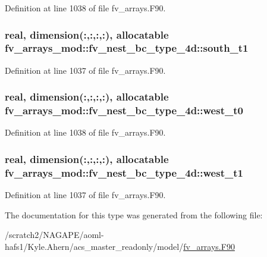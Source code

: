 Definition at line 1038 of file fv\-\_\-arrays.\-F90.

\subsubsection[{south\-\_\-t1}]{\setlength{\rightskip}{0pt plus 5cm}real, dimension(\-:,\-:,\-:,\-:), allocatable fv\-\_\-arrays\-\_\-mod\-::fv\-\_\-nest\-\_\-bc\-\_\-type\-\_\-4d\-::south\-\_\-t1}\label{structfv__arrays__mod_1_1fv__nest__bc__type__4d_a8c7b5e62f810595da5d2f3e668cecb46}


Definition at line 1037 of file fv\-\_\-arrays.\-F90.

\subsubsection[{west\-\_\-t0}]{\setlength{\rightskip}{0pt plus 5cm}real, dimension(\-:,\-:,\-:,\-:), allocatable fv\-\_\-arrays\-\_\-mod\-::fv\-\_\-nest\-\_\-bc\-\_\-type\-\_\-4d\-::west\-\_\-t0}\label{structfv__arrays__mod_1_1fv__nest__bc__type__4d_a6d5755433238a327bc454f0f8ecf7715}


Definition at line 1038 of file fv\-\_\-arrays.\-F90.

\subsubsection[{west\-\_\-t1}]{\setlength{\rightskip}{0pt plus 5cm}real, dimension(\-:,\-:,\-:,\-:), allocatable fv\-\_\-arrays\-\_\-mod\-::fv\-\_\-nest\-\_\-bc\-\_\-type\-\_\-4d\-::west\-\_\-t1}\label{structfv__arrays__mod_1_1fv__nest__bc__type__4d_a0ce309c499ec88025396f768151f5ae5}


Definition at line 1037 of file fv\-\_\-arrays.\-F90.



The documentation for this type was generated from the following file\-:\begin{DoxyCompactItemize}
\item 
/scratch2/\-N\-A\-G\-A\-P\-E/aoml-\/hafs1/\-Kyle.\-Ahern/acs\-\_\-master\-\_\-readonly/model/\hyperlink{fv__arrays_8F90}{fv\-\_\-arrays.\-F90}\end{DoxyCompactItemize}
